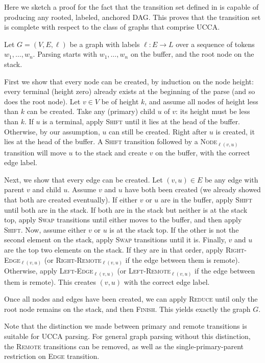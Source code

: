 \documentclass[11pt,a4paper]{article}
\begin{document}
Here we sketch a proof for the fact that the transition set defined in \cite{hershcovich2017a}
is capable of producing any rooted, labeled, anchored DAG.
This proves that the transition set is complete with respect to the class of graphs that
comprise UCCA.

Let $G=(V,E,\ell)$ be a graph with labels $\ell:E\rightarrow L$
over a sequence of tokens $w_1, \ldots, w_n$.
Parsing starts with $w_1, \ldots, w_n$ on the buffer,
and the root node on the stack.

First we show that every node can be created, by induction on the node height:
every terminal (height zero) already exists at the beginning of the parse
(and so does the root node).
Let $v\in V$ be of height $k$, and assume all nodes of height less than $k$ can be created.
Take any (primary) child $u$ of $v$: its height must be less than $k$.
If $u$ is a terminal, apply \textsc{Shift} until it lies at the head of the buffer.
Otherwise, by our assumption, $u$ can still be created.
Right after $u$ is created, it lies at the head of the buffer.
A \textsc{Shift} transition followed by a \textsc{Node}$_{\ell(v,u)}$ transition will
move $u$ to the stack and create $v$ on the buffer, with the correct edge label.

Next, we show that every edge can be created.
Let $(v,u) \in E$ be any edge with parent $v$ and child $u$.
Assume $v$ and $u$ have both been created (we already showed that both are created eventually).
If either $v$ or $u$ are in the buffer, apply \textsc{Shift} until both are in the stack.
If both are in the stack but neither is at the stack top, apply \textsc{Swap} transitions
until either moves to the buffer, and then apply \textsc{Shift}.
Now, assume either $v$ or $u$ is at the stack top.
If the other is not the second element on the stack, apply \textsc{Swap} transitions until it is.
Finally, $v$ and $u$ are the top two elements on the stack.
If they are in that order, apply \textsc{Right-Edge}$_{\ell(v,u)}$
(or \textsc{Right-Remote}$_{\ell(v,u)}$ if the edge between them is remote).
Otherwise, apply \textsc{Left-Edge}$_{\ell(v,u)}$
(or \textsc{Left-Remote}$_{\ell(v,u)}$ if the edge between them is remote).
This creates $(v,u)$ with the correct edge label.

Once all nodes and edges have been created, we can apply \textsc{Reduce} until only the
root node remains on the stack, and then \textsc{Finish}.
This yields exactly the graph $G$.

Note that the distinction we made between primary and remote transitions is suitable for UCCA parsing.
For general graph parsing without this distinction,
the \textsc{Remote} transitions can be removed, as well as the single-primary-parent
restriction on \textsc{Edge} transition.
\end{document}
